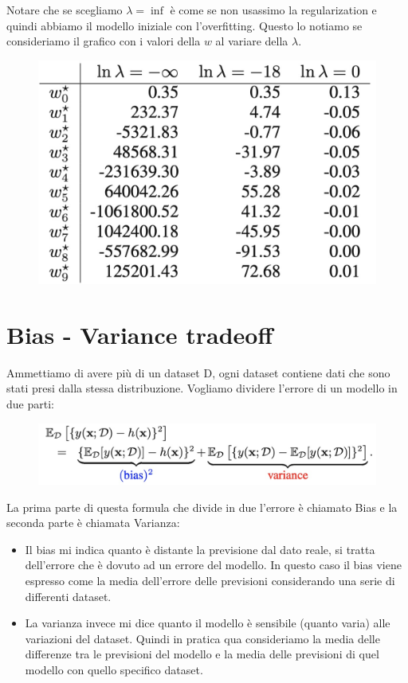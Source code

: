 \documentclass[14pt]{extreport}
\begin{document}
Notare che se scegliamo $\lambda = \inf$ è come se non usassimo la regularization e quindi abbiamo il modello iniziale con l'overfitting. Questo lo
notiamo se consideriamo il grafico con i valori della $w$ al variare della $\lambda$.

\begin{figure}[H]
\centering
\includegraphics[width=0.4\linewidth]{91.jpeg}
\end{figure}


\section{Bias - Variance tradeoff}

Ammettiamo di avere più di un dataset D, ogni dataset contiene dati che sono stati presi dalla stessa distribuzione. Vogliamo dividere l'errore di un
modello in due parti:

\begin{figure}[H]
\centering
\includegraphics[width=0.7\linewidth]{92.jpeg}
\end{figure}

La prima parte di questa formula che divide in due l'errore è chiamato Bias e la seconda parte è chiamata Varianza:
\begin{itemize}
\item Il bias mi indica quanto è distante la previsione dal dato reale, si tratta dell'errore che è dovuto ad un errore del modello. In questo caso il
bias viene espresso come la media dell'errore delle previsioni considerando una serie di differenti dataset.
\item La varianza invece mi dice quanto il modello è sensibile (quanto varia) alle variazioni del dataset. Quindi in pratica qua consideriamo la media
delle differenze tra le previsioni del modello e la media delle previsioni di quel modello con quello specifico dataset.
\end{itemize}
\end{document}

